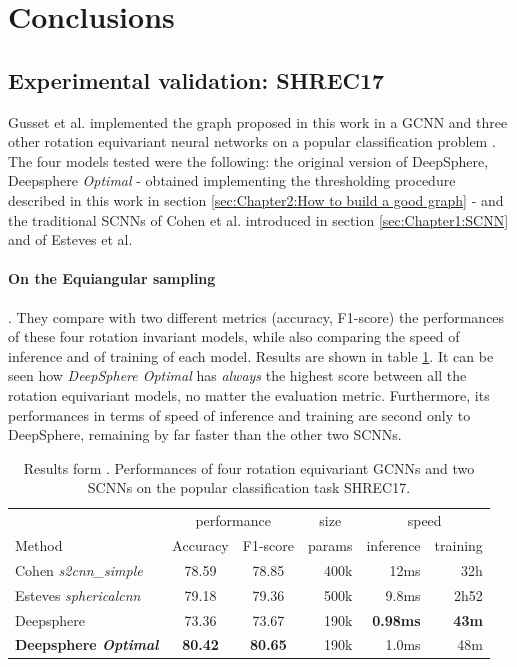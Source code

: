 

\section{Conclusions}\label{sec:Chapter4}




\subsection{Experimental validation: SHREC17}
\label{sec:Chapter5:Experimental validation}
Gusset et al. \cite{Gusset} implemented the graph proposed in this work in a GCNN and three other rotation equivariant neural networks on a popular classification problem \cite{SHREC17}. The four models tested were the following: the original version of DeepSphere, Deepsphere \textit{Optimal} - obtained implementing the thresholding procedure described in this work in section \ref{sec:Chapter2:How to build a good graph} - and the traditional SCNNs of Cohen et al. \cite{SCNN} introduced in section \ref{sec:Chapter1:SCNN} and of Esteves et al. \cite{Esteves}
\paragraph{On the Equiangular sampling}. They compare with two different metrics  (accuracy, F1-score) the performances of these four rotation invariant models, while also comparing the speed of inference and of training of each model. Results are shown in table \ref{tab:SHREC17_class}.  It can be seen how \textit{DeepSphere Optimal} has \textit{always} the highest score between all the rotation equivariant models, no matter the evaluation metric. Furthermore, its performances in terms of speed of inference and training are second only to DeepSphere, remaining by far faster than the other two SCNNs. 
\begin{table}[ht]
	\centering
	\begin{tabular}{l|c c r r r}
		\multicolumn{1}{l}{} & \multicolumn{2}{c}{performance} & \multicolumn{1}{c}{size} & \multicolumn{2}{c}{speed}\\
		\cmidrule(lr){2-3} \cmidrule(lr){4-4} \cmidrule(lr){5-6}
		\multicolumn{1}{l}{Method} & Accuracy & F1-score & params & inference & training \\ \hline
		Cohen \emph{s2cnn\_simple} & 78.59 & 78.85 & 400k & 12ms & 32h\\
		Esteves \emph{sphericalcnn} & 79.18 & 79.36 & 500k & 9.8ms & 2h52\\ \hline
		Deepsphere & 73.36 & 73.67 & 190k & \textbf{0.98ms} & \textbf{43m} \\
		\textbf{Deepsphere \emph{Optimal}} & \textbf{80.42} & \textbf{80.65} & 190k & 1.0ms & 48m
	\end{tabular}
	\caption{Results form \cite{Gusset}. Performances of four rotation equivariant GCNNs and two SCNNs on the popular classification task SHREC17.}
	\label{tab:SHREC17_class}
\end{table}
